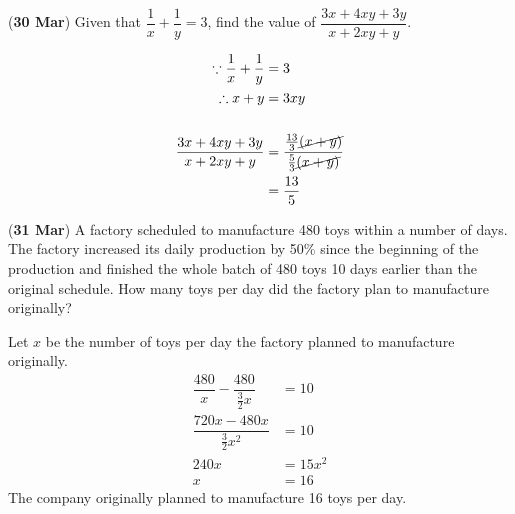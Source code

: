 \documentclass[12pt, answers]{exam}
\begin{document}
\begin{questions}
	\question (\textbf{30 Mar}) Given that \(\dfrac{1}{x} + \dfrac{1}{y} = 3\),
	find the value of \(\dfrac{3x + 4xy + 3y}{x + 2xy + y}\).
	\begin{solution}
		\begin{align*}
			\because \dfrac{1}{x} + \dfrac{1}{y} & = 3                                                             \\
			\therefore x + y                     & = 3xy                                                           \\
			\\
			\dfrac{3x+4xy+3y}{x+2xy+y}           & = \dfrac{\frac{13}{3}\cancel{(x+y)}}{\frac{5}{3}\cancel{(x+y)}} \\
			                                     & = \dfrac{13}{5}                                                 \\
		\end{align*}
	\end{solution}

	\question (\textbf{31 Mar})
	A factory scheduled to manufacture 480 toys within a number of days.
	The factory increased its daily production by 50\% since the beginning
	of the production and finished the whole batch of 480 toys 10 days earlier
	than the original schedule. How many toys per day did the factory plan
	to manufacture originally?

	\begin{solution}
		Let \(x\) be the number of toys per day the factory planned to manufacture originally.
		\begin{align*}
			\dfrac{480}{x} - \dfrac{480}{\frac{3}{2}x} & = 10    \\
			\dfrac{720x - 480x}{\frac{3}{2}x^2}        & = 10    \\
			240x                                       & = 15x^2 \\
			x                                          & = 16
		\end{align*}
		The company originally planned to manufacture 16 toys per day.
	\end{solution}


\end{questions}
\end{document}
